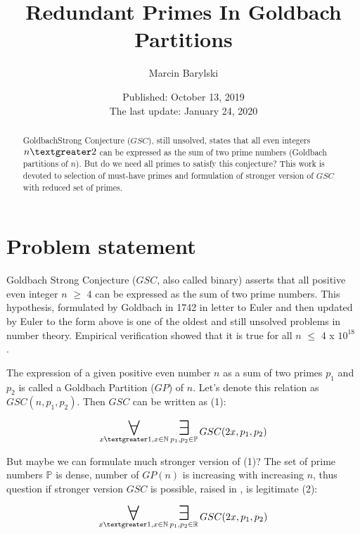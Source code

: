 \documentclass[10pt,twocolumn]{article}
\title{Redundant Primes In Goldbach Partitions}
\author{Marcin Barylski}
\date{\small{Published: October 13, 2019 \\ The last update: January 24, 2020}}
\newcommand\bigforall{\mbox{\huge $\mathsurround0pt\forall$}}
\newcommand\bigexists{\mbox{\huge $\mathsurround0pt\exists$}}
\begin{document}
\maketitle

\begin{abstract}
GoldbachStrong Conjecture ($GSC$), still unsolved, states that all even integers $n \textgreater 2$ can be expressed as the sum of two prime numbers (Goldbach partitions of $n$). But do we need all primes to satisfy this conjecture? This work is devoted to selection of must-have primes and formulation of stronger version of $GSC$ with reduced set of primes.
\end{abstract}

\section{Problem statement}

Goldbach Strong Conjecture ($GSC$, also called binary) asserts that all positive even integer $n$ $\geq$ 4 can be expressed as the sum of two prime numbers. This hypothesis, formulated by Goldbach in 1742 in letter to Euler \cite{goldbach1742} and then updated by Euler to the form above is one of the oldest and still unsolved problems in number theory. Empirical verification showed that it is true for all $n$ $\leq$ 4 x $10^{18}$ \cite{oliveira2012} \cite{oliveira2013}.\par
The expression of a given positive even number $n$ as a sum of two primes $p_1$ and $p_2$ is called a Goldbach Partition ($GP$) of $n$.  Let's denote this relation as $GSC(n, p_1, p_2)$. Then $GSC$ can be written as (1):

\begin{equation}
\displaystyle\mathop{\bigforall}_{x \textgreater 1, x \in \mathbb{N}} \displaystyle\mathop{\bigexists}_{p_1, p_2 \in \mathbb{P}} GSC (2x, p_1, p_2)
\end{equation}

But maybe we can formulate much stronger version of (1)? The set of prime numbers $\mathbb{P}$ is dense, number of $GP(n)$ is increasing with increasing $n$, thus question if stronger version $GSC$ is possible, raised in \cite{barylski2018}, is legitimate (2):

\begin{equation}
\displaystyle\mathop{\bigforall}_{x \textgreater 1, x \in \mathbb{N}} \displaystyle\mathop{\bigexists}_{p_1, p_2 \in \mathbb{R}} GSC (2x, p_1, p_2)
\end{equation}
\end{document}
